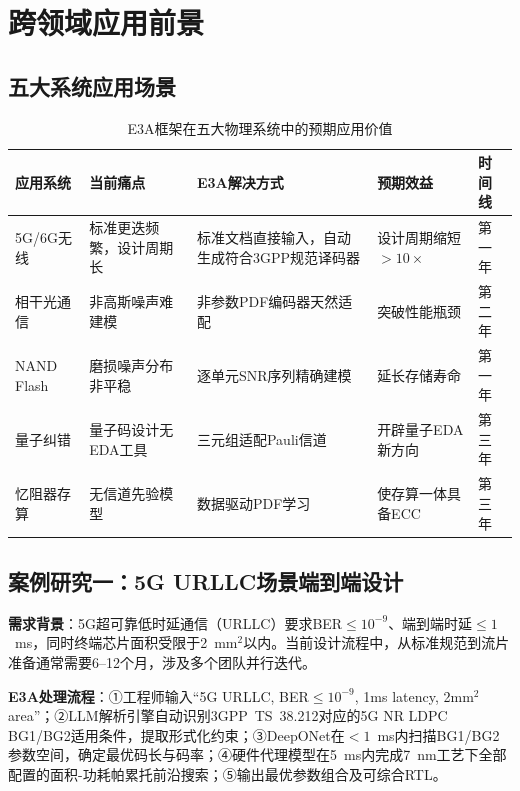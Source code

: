﻿\section{跨领域应用前景}\label{sec:applications}

\subsection{五大系统应用场景}

\begin{table}[htbp]
\centering
\caption{E3A框架在五大物理系统中的预期应用价值}
\label{tab:applications}
\setlength{\tabcolsep}{4pt}
\begin{tabular}{@{}L{2.0cm}L{3.2cm}L{3.2cm}L{3.2cm}L{2.0cm}@{}}
\toprule
\textbf{应用系统} & \textbf{当前痛点} & \textbf{E3A解决方式} & \textbf{预期效益} & \textbf{时间线} \\
\midrule
5G/6G无线 & 标准更迭频繁，设计周期长 & 标准文档直接输入，自动生成符合3GPP规范译码器 & 设计周期缩短$>10\times$ & 第一年 \\
相干光通信 & 非高斯噪声难建模 & 非参数PDF编码器天然适配 & 突破性能瓶颈 & 第二年 \\
NAND Flash & 磨损噪声分布非平稳 & 逐单元SNR序列精确建模 & 延长存储寿命 & 第一年 \\
量子纠错 & 量子码设计无EDA工具 & 三元组适配Pauli信道 & 开辟量子EDA新方向 & 第三年 \\
忆阻器存算 & 无信道先验模型 & 数据驱动PDF学习 & 使存算一体具备ECC & 第三年 \\
\bottomrule
\end{tabular}
\end{table}

\subsection{案例研究一：5G URLLC场景端到端设计}

\textbf{需求背景}：5G超可靠低时延通信（URLLC）要求BER$\leq 10^{-9}$、端到端时延$\leq 1$~ms，同时终端芯片面积受限于2~mm$^2$以内。当前设计流程中，从标准规范到流片准备通常需要6--12个月，涉及多个团队并行迭代。

\textbf{E3A处理流程}：①工程师输入``5G URLLC, BER$\leq10^{-9}$, 1ms latency, 2mm$^2$ area''；②LLM解析引擎自动识别3GPP~TS~38.212对应的5G NR LDPC BG1/BG2适用条件，提取形式化约束；③DeepONet在$<1$~ms内扫描BG1/BG2参数空间，确定最优码长与码率；④硬件代理模型在5~ms内完成7~nm工艺下全部配置的面积-功耗帕累托前沿搜索；⑤输出最优参数组合及可综合RTL。

